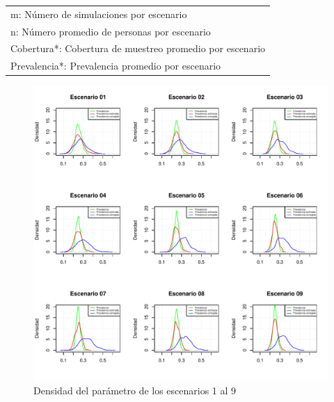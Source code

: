 \begin{table}[h]
\begin{tabular}{cccccccc}
		\multicolumn{8}{l}{m: Número de simulaciones por escenario}                           \\
		\multicolumn{8}{l}{n: Número promedio de personas por escenario}                      \\
		\multicolumn{8}{l}{Cobertura*: Cobertura de muestreo promedio por escenario}          \\
		\multicolumn{8}{l}{Prevalencia*: Prevalencia promedio por escenario}                  \\ \hline
	\end{tabular}
\end{table}

\newpage

\begin{figure}[h] 
	\centering
	\includegraphics[width=1\textwidth]{graficos/simu_01-09.pdf}
	\caption{Densidad del parámetro de los escenarios 1 al 9} \label{simu_01-09}
\end{figure}

\newpage

